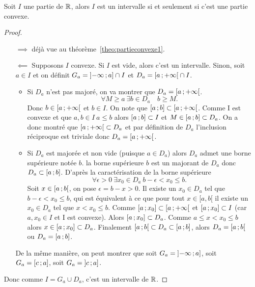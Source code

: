 \begin{theo}
  Soit $I$ une partie de $\mathbb{R}$, alors $I$ est un intervalle si et seulement si c'est une partie convexe.
\end{theo}
\begin{proof}
  \begin{itemize}
  \item[$\implies$] déjà vue au théorème~\ref{theo:partieconvexe1}.
  \item[$\impliedby$] Supposons $I$ convexe. Si $I$ est vide, alors c'est un intervalle. Sinon, soit $a\in I$ et on définit $G_a=\left] -\infty \, ;  a \right]\cap I$ et $D_a=\left[ a \, ;  +\infty \right[\cap I$.
    \begin{itemize}
    \item Si $D_a$ n'est pas majoré, on va montrer que $D_a=\left[ a \, ;  +\infty \right[$.
      \begin{equation}
        \forall M \geq a \ \exists b \in D_a \quad b\geq M.
      \end{equation}
      Donc $b\in \left[ a \, ;  +\infty \right[$ et $b\in I$. On note que $\left[ a \, ;  b \right]\subset \left[ a \, ;  +\infty \right[$. Comme I est convexe et que $a,b \in I \ a \leq b$ alors $\left[ a \, ;  b \right]\subset I$ et $M\in \left[ a \, ;  b \right] \subset D_a$. On a donc montré que $\left[ a \, ;  +\infty \right[ \subset D_a$ et par définition de $D_a$ l'inclusion réciproque est triviale donc $D_a=\left[ a \, ;  +\infty \right[$.
    \item Si $D_a$ est majorée et non vide (puisque $a\in D_a$) alors $D_a$ admet une borne supérieure notée $b$. la borne supérieure $b$ est un majorant de $D_a$ donc $D_a \subset \left[ a \, ;  b \right]$. D'après la caractérisation de la borne supérieure
      \begin{equation}
        \forall \epsilon >0 \ \exists x_0 \in D_a \ b-\epsilon < x_0\leq b.
      \end{equation}
      Soit $x\in \left[ a \, ;  b \right[$, on pose $\epsilon=b-x>0$. Il existe un $x_0\in D_a$ tel que $b-\epsilon<x_0 \leq b$, qui est équivalent à ce que pour tout $x\in[a,b[$ il existe un $x_0\in D_a$ tel que $x<x_0 \leq b$. Comme $\left[ a \, ;  x_0 \right]\subset \left[ a \, ;  +\infty \right[$ et $\left[ a \, ;  x_0 \right]\subset I$ (car $a,x_0 \in I$ et I est convexe). Alors $\left[ a \, ;  x_0 \right] \subset D_a$. Comme $a\leq x < x_0\leq b$ alors $x\in \left[ a \, ;  x_0 \right]\subset D_a$. Finalement $\left[ a \, ;  b \right[\subset D_a \subset \left[ a \, ;  b \right]$, alors $D_a=\left[ a \, ;  b \right[$ ou $D_a=\left[ a \, ;  b \right]$.
    \end{itemize}
    De la même manière, on peut montrer que soit $G_a=\left] -\infty \, ;  a \right]$, soit $G_a=\left[ c \, ;  a \right]$, soit $G_a=\left] c \, ;  a \right]$.
  \end{itemize}
  Donc comme $I=G_a\cup D_a$, c'est un intervalle de $\mathbb{R}$.
\end{proof}

